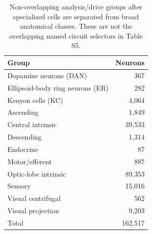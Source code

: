\documentclass[11pt]{article}
\begin{document}
\begin{table}[htbp]
\caption{Non-overlapping analysis/drive groups after specialized cells are separated from broad anatomical classes. These are not the overlapping named circuit selectors in Table S5.}
\centering\small\begin{tabular}{@{}lr@{}}\toprule Group & Neurons \\ \midrule
Dopamine neurons (DAN) & 367 \\
Ellipsoid-body ring neurons (ER) & 282 \\
Kenyon cells (KC) & 4,064 \\
Ascending & 1,849 \\
Central intrinsic & 39,533 \\
Descending & 1,314 \\
Endocrine & 87 \\
Motor/efferent & 887 \\
Optic-lobe intrinsic & 89,353 \\
Sensory & 15,016 \\
Visual centrifugal & 562 \\
Visual projection & 9,203 \\
\midrule Total & 162,517 \\ \bottomrule\end{tabular}
\end{table}
\end{document}
